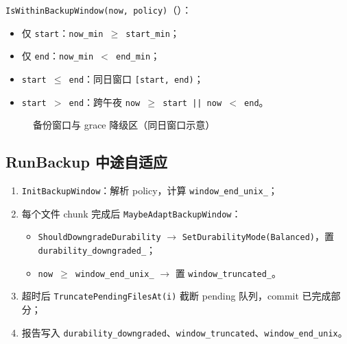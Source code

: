 \texttt{IsWithinBackupWindow(now, policy)}（）：
\begin{itemize}[nosep]
  \item 仅 \texttt{start}：\texttt{now\_min $\geq$ start\_min}；
  \item 仅 \texttt{end}：\texttt{now\_min $<$ end\_min}；
  \item \texttt{start $\leq$ end}：同日窗口 \texttt{[start, end)}；
  \item \texttt{start $>$ end}：跨午夜 \texttt{now $\geq$ start || now $<$ end}。
\end{itemize}

\begin{figure}[htbp]
\centering
{}
\caption{备份窗口与 grace 降级区（同日窗口示意）}
\label{fig:backup-window}
\end{figure}

\subsection{RunBackup 中途自适应}

\begin{enumerate}[nosep]
  \item \texttt{InitBackupWindow}：解析 policy，计算 \texttt{window\_end\_unix\_}；
  \item 每个文件 chunk 完成后 \texttt{MaybeAdaptBackupWindow}：
  \begin{itemize}[nosep]
    \item \texttt{ShouldDowngradeDurability} $\rightarrow$ \texttt{SetDurabilityMode(Balanced)}，置 \texttt{durability\_downgraded\_}；
    \item \texttt{now $\geq$ window\_end\_unix\_} $\rightarrow$ 置 \texttt{window\_truncated\_}。
  \end{itemize}
  \item 超时后 \texttt{TruncatePendingFilesAt(i)} 截断 pending 队列，commit 已完成部分；
  \item 报告写入 \texttt{durability\_downgraded}、\texttt{window\_truncated}、\texttt{window\_end\_unix}。
\end{enumerate}

